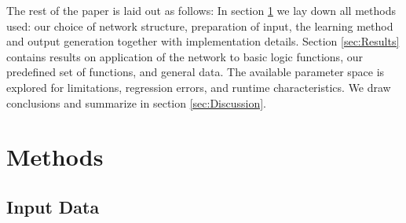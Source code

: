 \documentclass[useAMS,usenatbib]{mn2e}
\begin{document}
The rest of the paper is laid out as follows: In section
\ref{sec:Methods} we lay down all methods used: our choice of network
structure, preparation of input, the learning method and output
generation together with implementation details. Section
\ref{sec:Results} contains results on application of the network to
basic logic functions, our predefined set of functions, and general
data. The available parameter space is explored for limitations,
regression errors, and runtime characteristics. We draw conclusions
and summarize in section \ref{sec:Discussion}.

\section{Methods}
\label{sec:Methods}
\subsection{Input Data}
\end{document}
